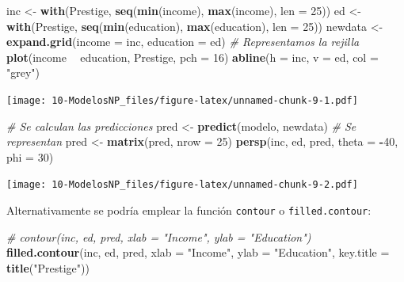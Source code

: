 \documentclass[]{book}
\newenvironment{Shaded}{\begin{snugshade}}{\end{snugshade}}
\newcommand{\KeywordTok}[1]{\textcolor[rgb]{0.13,0.29,0.53}{\textbf{#1}}}
\newcommand{\DataTypeTok}[1]{\textcolor[rgb]{0.13,0.29,0.53}{#1}}
\newcommand{\DecValTok}[1]{\textcolor[rgb]{0.00,0.00,0.81}{#1}}
\newcommand{\StringTok}[1]{\textcolor[rgb]{0.31,0.60,0.02}{#1}}
\newcommand{\CommentTok}[1]{\textcolor[rgb]{0.56,0.35,0.01}{\textit{#1}}}
\newcommand{\OperatorTok}[1]{\textcolor[rgb]{0.81,0.36,0.00}{\textbf{#1}}}
\newcommand{\NormalTok}[1]{#1}
\begin{document}
\begin{Shaded}
\begin{Highlighting}[]
\NormalTok{inc <-}\StringTok{ }\KeywordTok{with}\NormalTok{(Prestige, }\KeywordTok{seq}\NormalTok{(}\KeywordTok{min}\NormalTok{(income), }\KeywordTok{max}\NormalTok{(income), }\DataTypeTok{len =} \DecValTok{25}\NormalTok{))}
\NormalTok{ed <-}\StringTok{ }\KeywordTok{with}\NormalTok{(Prestige, }\KeywordTok{seq}\NormalTok{(}\KeywordTok{min}\NormalTok{(education), }\KeywordTok{max}\NormalTok{(education), }\DataTypeTok{len =} \DecValTok{25}\NormalTok{))}
\NormalTok{newdata <-}\StringTok{ }\KeywordTok{expand.grid}\NormalTok{(}\DataTypeTok{income =}\NormalTok{ inc, }\DataTypeTok{education =}\NormalTok{ ed)}
\CommentTok{# Representamos la rejilla}
\KeywordTok{plot}\NormalTok{(income }\OperatorTok{~}\StringTok{ }\NormalTok{education, Prestige, }\DataTypeTok{pch =} \DecValTok{16}\NormalTok{)}
\KeywordTok{abline}\NormalTok{(}\DataTypeTok{h =}\NormalTok{ inc, }\DataTypeTok{v =}\NormalTok{ ed, }\DataTypeTok{col =} \StringTok{"grey"}\NormalTok{)}
\end{Highlighting}
\end{Shaded}

\texttt{[image: 10-ModelosNP\_files/figure-latex/unnamed-chunk-9-1.pdf]}

\begin{Shaded}
\begin{Highlighting}[]
\CommentTok{# Se calculan las predicciones}
\NormalTok{pred <-}\StringTok{ }\KeywordTok{predict}\NormalTok{(modelo, newdata)}
\CommentTok{# Se representan}
\NormalTok{pred <-}\StringTok{ }\KeywordTok{matrix}\NormalTok{(pred, }\DataTypeTok{nrow =} \DecValTok{25}\NormalTok{)}
\KeywordTok{persp}\NormalTok{(inc, ed, pred, }\DataTypeTok{theta =} \OperatorTok{-}\DecValTok{40}\NormalTok{, }\DataTypeTok{phi =} \DecValTok{30}\NormalTok{)}
\end{Highlighting}
\end{Shaded}

\texttt{[image: 10-ModelosNP\_files/figure-latex/unnamed-chunk-9-2.pdf]}

Alternativamente se podría emplear la función \texttt{contour} o
\texttt{filled.contour}:

\begin{Shaded}
\begin{Highlighting}[]
\CommentTok{# contour(inc, ed, pred, xlab = "Income", ylab = "Education")}
\KeywordTok{filled.contour}\NormalTok{(inc, ed, pred, }\DataTypeTok{xlab =} \StringTok{"Income"}\NormalTok{, }\DataTypeTok{ylab =} \StringTok{"Education"}\NormalTok{, }\DataTypeTok{key.title =} \KeywordTok{title}\NormalTok{(}\StringTok{"Prestige"}\NormalTok{))}
\end{Highlighting}
\end{Shaded}
\end{document}
